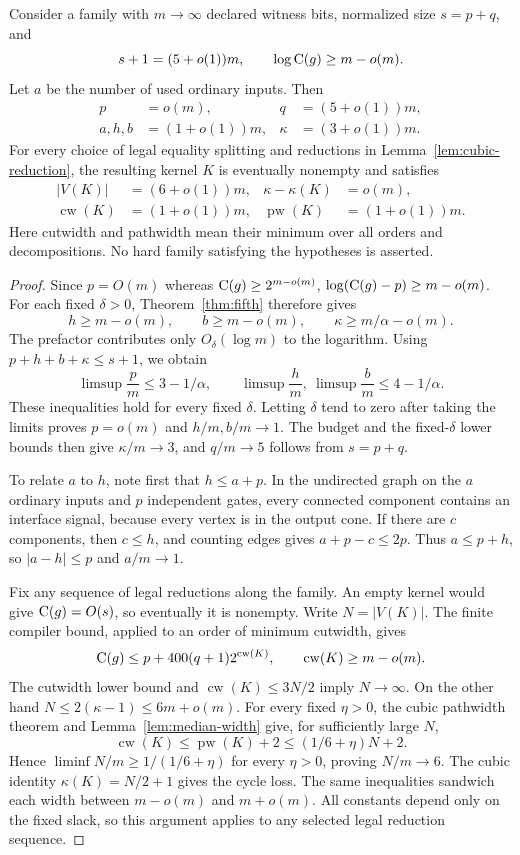 \begin{theorem}
\label{thm:critical-structure}
Consider a family with $m\to\infty$ declared witness bits, normalized
size $s=p+q$, and
\[
 s+1=(5+o(1))m,\qquad \log\mathrm{C}(g)\ge m-o(m).
\]
Let $a$ be the number of used ordinary inputs. Then
\begin{align*}
 p&=o(m),& q&=(5+o(1))m,\\
 a,h,b&=(1+o(1))m,& \kappa&=(3+o(1))m.
\end{align*}
For every choice of legal equality splitting and reductions in
Lemma~\ref{lem:cubic-reduction}, the resulting kernel $K$ is
eventually nonempty and satisfies
\begin{align*}
 |V(K)|&=(6+o(1))m,& \kappa-\kappa(K)&=o(m),\\
 \operatorname{cw}(K)&=(1+o(1))m,&
 \operatorname{pw}(K)&=(1+o(1))m.
\end{align*}
Here cutwidth and pathwidth mean their minimum over all orders and
decompositions. No hard family satisfying the hypotheses is asserted.
\end{theorem}
\begin{proof}
Since $p=O(m)$ whereas $\mathrm{C}(g)\ge2^{m-o(m)}$,
$\log(\mathrm{C}(g)-p)\ge m-o(m)$. For each fixed $\delta>0$,
Theorem~\ref{thm:fifth} therefore gives
\[
 h\ge m-o(m),\qquad b\ge m-o(m),\qquad
 \kappa\ge m/\alpha-o(m).
\]
The prefactor contributes only $O_\delta(\log m)$ to the logarithm.
Using $p+h+b+\kappa\le s+1$, we obtain
\[
 \limsup \frac{p}{m}\le3-1/\alpha,\qquad
 \limsup \frac{h}{m},\ \limsup\frac{b}{m}\le4-1/\alpha.
\]
These inequalities hold for every fixed $\delta$. Letting $\delta$
tend to zero after taking the limits proves $p=o(m)$ and
$h/m,b/m\to1$. The budget and the fixed-$\delta$ lower bounds
then give $\kappa/m\to3$, and $q/m\to5$ follows from $s=p+q$.

To relate $a$ to $h$, note first that $h\le a+p$. In the undirected
graph on the $a$ ordinary inputs and $p$ independent gates, every
connected component contains an interface signal, because every
vertex is in the output cone. If there are $c$ components, then
$c\le h$, and counting edges gives
$a+p-c\le2p$. Thus $a\le p+h$, so $|a-h|\le p$ and $a/m\to1$.

Fix any sequence of legal reductions along the family. An empty
kernel would give $\mathrm{C}(g)=O(s)$, so eventually it is nonempty.
Write $N=|V(K)|$. The finite compiler bound, applied to an order
of minimum cutwidth, gives
\[
 \mathrm{C}(g)\le p+400(q+1)2^{\operatorname{cw}(K)},
 \qquad \operatorname{cw}(K)\ge m-o(m).
\]
The cutwidth lower bound and $\operatorname{cw}(K)\le3N/2$ imply
$N\to\infty$. On the other hand $N\le2(\kappa-1)\le6m+o(m)$. For every fixed
$\eta>0$, the cubic pathwidth theorem and
Lemma~\ref{lem:median-width} give, for sufficiently large $N$,
\[
 \operatorname{cw}(K)\le\operatorname{pw}(K)+2
       \le(1/6+\eta)N+2.
\]
Hence $\liminf N/m\ge1/(1/6+\eta)$ for every $\eta>0$, proving
$N/m\to6$. The cubic identity $\kappa(K)=N/2+1$ gives the cycle
loss. The same inequalities sandwich each width between $m-o(m)$
and $m+o(m)$. All constants depend only on the fixed slack, so this
argument applies to any selected legal reduction sequence.
\end{proof}

